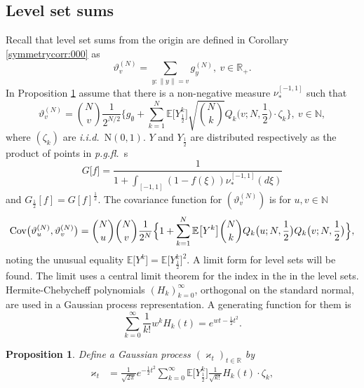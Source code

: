 \documentclass[preprint,11pt]{elsarticle}
\newtheorem{Proposition}{Proposition}
\theoremstyle{remark}
\def\spin{{[-1,1]}}
\def\pgfl{\emph{p.g.fl.~}}
\def\iid{\emph{i.i.d.}~}
\begin{document}
{\subsection{Level set sums}\label{subsection:level}
Recall that level set sums from the origin are defined in Corollary \ref{symmetrycorr:000} as 
\[
\vartheta_v^{(N)}
= \sum_{y:\|y\|=v}g_y^{(N)},\ v\in \mathbb{R}_+.
\]
In Proposition \ref{proplevel:00} assume that there is a non-negative measure $\nu_*^\spin$ such that
\begin{equation}
\vartheta^{(N)}_{v} = {N\choose v}
 \frac{1}{2^{N/2}}\Big \{g_\emptyset +
\sum_{k=1}^{N}
\mathbb{E}\big [Y^k_{\frac{1}{2}}\big ]
 \sqrt{{N\choose k}}Q_k\big (v;N,\frac{1}{2}\big )\cdot \zeta_k\Big \},\ v \in \mathbb{N},
\label{symmetry:001a}
\end{equation}
where $(\zeta_k)$ are \iid N$(0,1)$. $Y$ and $Y_{\frac{1}{2}}$ are distributed respectively as the product of points in  \pgfl s
\begin{equation}
G\big [f\big ]=\frac {1}{1 + \int_\spin (1-f(\xi))\nu_*^\spin(d\xi)}
\label{Gstar:00}
\end{equation}
and $G_{\frac{1}{2}}[f]=G[f]^{\frac{1}{2}}$. The covariance function for $(\vartheta^{(N)}_{v})$ is for
$u,v \in \mathbb{N}$
\begin{equation}
\text{\rm Cov}\big (\vartheta^{(N)}_{u},\vartheta^{(N)}_{v}\big )
= {N\choose u}{N\choose v}
 \frac{1}{2^N}\Big \{1+
\sum_{k=1}^{N}
\mathbb{E}\big [Y^k\big ]
{N\choose k}Q_k\big (u;N,\frac{1}{2}\big )Q_k\big (v;N,\frac{1}{2}\big )\Big \},
 \label{covstarlevel:00}
\end{equation}
noting the unusual equality $\mathbb{E}\big [Y^k\big ] = \mathbb{E}\big [Y_{\frac{1}{2}}^k\big ]^2$. 
A limit form for level sets will be found. The limit uses a central limit theorem for the index in the in the level sets. Hermite-Chebycheff polynomials $(H_k)_{k=0}^\infty$, orthogonal on the standard normal, are used in a Gaussian process representation.  A generating function for them is
\[
\sum_{k=0}^\infty \frac{1}{k!}w^kH_k(t) = e^{wt - \frac{1}{2}t^2}.
\]
%
\begin{Proposition}\label{proplevel:00}
Define a Gaussian process %
$(\varkappa_t)_{t\in \mathbb{R}}$ by
\begin{align}
\varkappa_t
&= \frac{1}{\sqrt{2\pi}}e^{-\frac{1}{2}t^2}
\sum_{k=0}^\infty \mathbb{E}\big [Y_{\frac{1}{2}}^k\big ]
\frac{1}{\sqrt{k!}}H_k(t)\cdot \zeta_k,
\label{decomposition:22}
\end{align}

\end{Proposition}}
\end{document}
